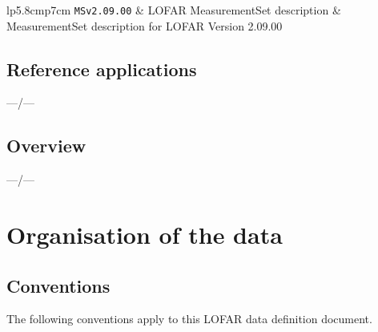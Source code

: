 \documentclass[a4paper,10pt,bibtotoc]{scrartcl}
\begin{document}


\begin{center}
  \tablelasttail{\hline}
  \begin{supertabular}{lp{5.8cm}p{7cm}}
    \shrinkheight{-4.5em}
    \texttt{MSv2.09.00} \cite{ms2.lofar.2022} & LOFAR MeasurementSet description & MeasurementSet description for LOFAR Version 2.09.00 \\
    \hline
  \end{supertabular}
\end{center}

\subsection{Reference applications}

---/---

\subsection{Overview}

---/---

\newpage
\section{Organisation of the data}
\label{sec:structure}

\subsection{Conventions}
The following conventions apply to this LOFAR data definition document.
\end{document}
